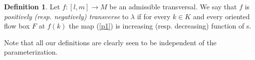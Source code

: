 \documentclass{ip-journal}
\theoremstyle{definition}
\newtheorem{definition}[theorem]{Definition}
\newtheorem{remark}[theorem]{Remark}
\numberwithin{equation}{section}
\begin{document}
\begin{definition}\label{MDefinition5} Let $f: [l, m] \rightarrow M$ be an admissible transversal. We say that 
  $f$ is {\it{positively (resp. negatively) transverse}} to $ \lambda$ if for every $k \in K$ and every oriented flow box $F$ at $f(k)$ the map (\ref{p1}) is increasing (resp. decreasing) function of s.

Note that all our definitions are clearly seen to be independent of the parameterization. 
\end{definition}

\end{document}
